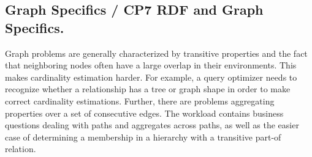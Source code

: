 \subsection*{Graph Specifics / CP7 RDF and Graph Specifics.}

Graph problems are generally characterized by transitive properties
and the fact that neighboring nodes often have a large overlap in
their environments.  This makes cardinality estimation harder.  For
example, a query optimizer needs to recognize whether a relationship
has a tree or graph shape in order to make correct cardinality
estimations.  Further, there are problems aggregating properties over
a set of consecutive edges.  The workload contains business questions
dealing with paths and aggregates across paths, as well as the easier
case of determining a membership in a hierarchy with a transitive
part-of relation.

